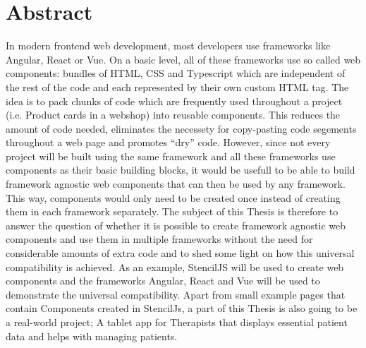 \chapter{Abstract}


In modern frontend web development, most developers use frameworks like Angular, React or Vue. On a basic level, all of these frameworks use so called web components: bundles of HTML, CSS and Typescript which are independent of the rest of the code and each represented by their own custom HTML tag. The idea is to pack chunks of code which are frequently used throughout a project (i.e. Product cards in a webshop) into reusable components. This reduces the amount of code needed, eliminates the necessety for copy-pasting code segements throughout a web page and promotes “dry” code. 
However, since not every project will be built using the same framework and all these frameworks use components as their basic building blocks, it would be usefull to be able to build framework agnostic web components that can then be used by any framework. This way, components would only need to be created once instead of creating them in each framework separately. 
The subject of this Thesis is therefore to answer the question of whether it is possible to create framework agnostic web components and use them in multiple frameworks without the need for considerable amounts of extra code and to shed some light on how this universal compatibility is achieved. As an example, StencilJS will be used to create web components and the frameworks Angular, React and Vue will be used to demonstrate the universal compatibility. 
Apart from small example pages that contain Components created in StencilJs, a part of this Thesis is also going to be a real-world project; A tablet app for Therapists that displays essential patient data and helps with managing patients. 


